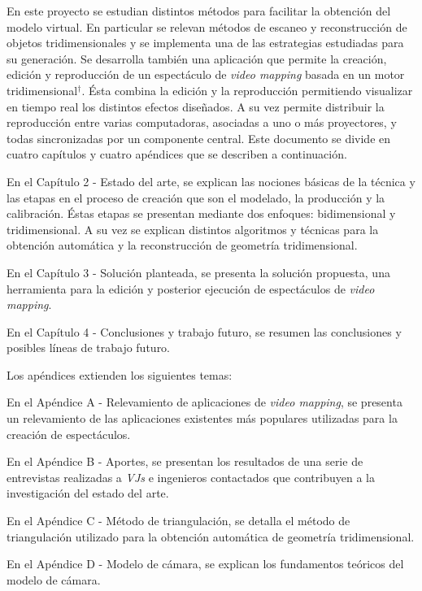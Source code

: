 En este proyecto se estudian distintos métodos para facilitar la obtención del modelo virtual. En particular se relevan métodos de escaneo y reconstrucción de objetos tridimensionales y se implementa una de las estrategias estudiadas para su generación.%
Se desarrolla también una aplicación que permite la creación, edición y reproducción de un espectáculo de \emph{video mapping} basada en un motor tridimensional$^\dagger$. Ésta combina la edición y la reproducción permitiendo visualizar en tiempo real los distintos efectos diseñados. A su vez permite distribuir la reproducción entre varias computadoras, asociadas a uno o más proyectores, y todas sincronizadas por un componente central.
\newpage
Este documento se divide en cuatro capítulos y cuatro apéndices que se describen a continuación.

En el Capítulo 2 - Estado del arte, se explican las nociones básicas de la técnica y las etapas en el proceso de creación que son el modelado, la producción y la calibración. Éstas etapas se presentan mediante dos enfoques: bidimensional y tridimensional. A su vez se explican distintos algoritmos y técnicas para la obtención automática y la reconstrucción de geometría tridimensional.

En el Capítulo 3 - Solución planteada, se presenta la solución propuesta, una herramienta para la edición y posterior ejecución de espectáculos de \emph{video mapping}.

En el Capítulo 4 - Conclusiones y trabajo futuro, se resumen las conclusiones y posibles líneas de trabajo futuro.

Los apéndices extienden los siguientes temas:

En el Apéndice A - Relevamiento de aplicaciones de \emph{video mapping}, se presenta un relevamiento de las aplicaciones existentes más populares utilizadas para la creación de espectáculos.

En el Apéndice B - Aportes, se presentan los resultados de una serie de entrevistas realizadas a \emph{VJs} e ingenieros contactados que contribuyen a la investigación del estado del arte.

En el Apéndice C - Método de triangulación, se detalla el método de triangulación utilizado para la obtención automática de geometría tridimensional.

En el Apéndice D - Modelo de cámara, se explican los fundamentos teóricos del modelo de cámara.


